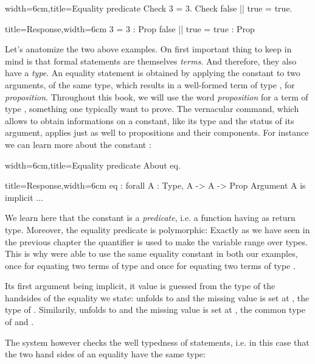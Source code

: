 \begin{coq}{width=6cm,title=Equality predicate}
Check 3 = 3.
Check false || true = true.
\end{coq}
\begin{coqout}{title=Response,width=6cm}
3 = 3 : Prop
false || true = true : Prop
\end{coqout}
Let's anatomize the two above examples. On first important thing to
keep in mind is that formal statements are themselves \emph{terms}. And
therefore, they also have a \emph{type}. An equality statement is
obtained by applying the constant  to two arguments, of the same
type, which results in a well-formed term of type ,
for \emph{proposition}. Throughout this book, we will use the word
\emph{proposition} for a term of type , something one
typically want to prove. The  vernacular
command, which allows to obtain informations on a constant, like its
type and the status of its argument, applies just as well to
propositions and their components. For instance we can learn more
about the constant :

\begin{coq}{width=6cm,title=Equality predicate}
About eq.
\end{coq}
\begin{coqout}{title=Response,width=6cm}
eq : forall A : Type, A -> A -> Prop
Argument A is implicit ...
\end{coqout}


We learn here that the constant  is a \emph{predicate}, i.e. a
function having  as return type. Moreover, the equality
predicate is polymorphic: Exactly as we have seen in the previous
chapter the  quantifier is used to make the variable 
range over types. This is why were able to use the same equality
constant in both our examples, once for equating two terms of type
 and once for equating two terms of type .

Its first argument being implicit, it value is guessed from the type
of the handsides of the equality we state:  unfolds to
 and the missing value is set at , the type of
. Similarily,  unfolds to
 and the missing value is set at
, the common type of  and .

The \Coq{} system however checks the well typedness of statements,
i.e. in this case that the two hand sides of an equality have the same
type:

